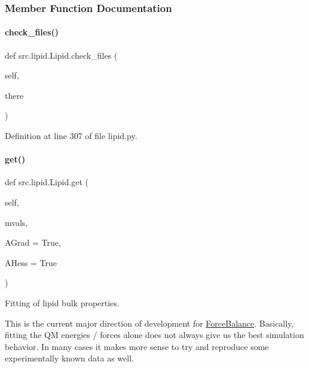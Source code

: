 \subsubsection{Member Function Documentation}
\mbox{\label{classsrc_1_1lipid_1_1Lipid_a552b527d87a715fc0e5bba641bfaef4d}} 
\paragraph{\texorpdfstring{check\+\_\+files()}{check\_files()}}
{\footnotesize\ttfamily def src.\+lipid.\+Lipid.\+check\+\_\+files (\begin{DoxyParamCaption}\item[{}]{self,  }\item[{}]{there }\end{DoxyParamCaption})}



Definition at line 307 of file lipid.\+py.

\mbox{\label{classsrc_1_1lipid_1_1Lipid_abee27b196cebb83890d15359ef80e1e6}} 
\paragraph{\texorpdfstring{get()}{get()}}
{\footnotesize\ttfamily def src.\+lipid.\+Lipid.\+get (\begin{DoxyParamCaption}\item[{}]{self,  }\item[{}]{mvals,  }\item[{}]{A\+Grad = {\ttfamily True},  }\item[{}]{A\+Hess = {\ttfamily True} }\end{DoxyParamCaption})}



Fitting of lipid bulk properties. 

This is the current major direction of development for \hyperlink{namespaceForceBalance}{Force\+Balance}. Basically, fitting the QM energies / forces alone does not always give us the best simulation behavior. In many cases it makes more sense to try and reproduce some experimentally known data as well.

